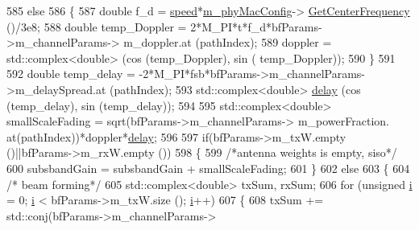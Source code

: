 \begin{DoxyCode}
585                                 \textcolor{keywordflow}{else}
586                                 \{
587                                         \textcolor{keywordtype}{double} f\_d = \hyperlink{mmwave-amc-test_8cc_a6dc6e6f3c75c509ce943163afb5dade7}{speed}*\hyperlink{classns3_1_1MmWaveChannelMatrix_ad92dc270601be7284b3e8b42654307fa}{m\_phyMacConfig}->
      \hyperlink{classns3_1_1MmWavePhyMacCommon_a0850d2e37c7075b9bce242723b722019}{GetCenterFrequency} ()/3e8;
588                                         \textcolor{keywordtype}{double} temp\_Doppler = 2*M\_PI*t*f\_d*bfParams->m\_channelParams->
      m\_doppler.at (pathIndex);
589                                         doppler = std::complex<double> (cos (temp\_Doppler), sin (
      temp\_Doppler));
590                                 \}
591 
592                                 \textcolor{keywordtype}{double} temp\_delay = -2*M\_PI*fsb*bfParams->m\_channelParams->m\_delaySpread.at
       (pathIndex);
593                                 std::complex<double> \hyperlink{lte_2model_2fading-traces_2fading__trace__generator_8m_a7964e6aa8f61a9d28973c8267a606ad8}{delay} (cos (temp\_delay), sin (temp\_delay));
594 
595                                 std::complex<double> smallScaleFading = sqrt(bfParams->m\_channelParams->
      m\_powerFraction. at(pathIndex))*doppler*\hyperlink{lte_2model_2fading-traces_2fading__trace__generator_8m_a7964e6aa8f61a9d28973c8267a606ad8}{delay};
596 
597                                 \textcolor{keywordflow}{if}(bfParams->m\_txW.empty ()||bfParams->m\_rxW.empty ())
598                                 \{
599                                         \textcolor{comment}{/*antenna weights is empty, siso*/}
600                                         subsbandGain = subsbandGain + smallScaleFading;
601                                 \}
602                                 \textcolor{keywordflow}{else}
603                                 \{
604                                         \textcolor{comment}{/* beam forming*/}
605                                         std::complex<double> txSum, rxSum;
606                                         \textcolor{keywordflow}{for} (\textcolor{keywordtype}{unsigned} \hyperlink{bernuolliDistribution_8m_a6f6ccfcf58b31cb6412107d9d5281426}{i} = 0; \hyperlink{bernuolliDistribution_8m_a6f6ccfcf58b31cb6412107d9d5281426}{i} < bfParams->m\_txW.size (); 
      \hyperlink{bernuolliDistribution_8m_a6f6ccfcf58b31cb6412107d9d5281426}{i}++)
607                                         \{
608                                                 txSum += std::conj(bfParams->m\_channelParams->

\end{DoxyCode}
